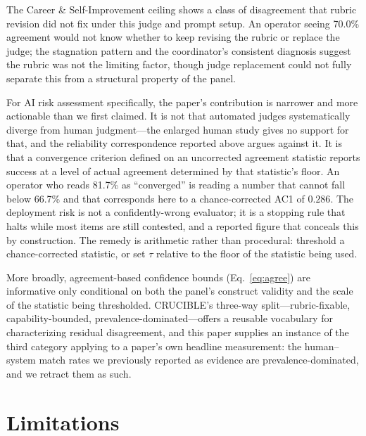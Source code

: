 \documentclass[letterpaper]{article}
\begin{document}
The Career \& Self-Improvement ceiling shows a class of disagreement that
rubric revision did not fix under this judge and prompt setup. An operator
seeing 70.0\% agreement would not know whether to keep revising the rubric or
replace the judge; the stagnation pattern and the coordinator's consistent
diagnosis suggest the rubric was not the limiting factor, though judge
replacement could not fully separate this from a structural property of the
panel.

For AI risk assessment specifically, the paper's contribution is narrower and
more actionable than we first claimed. It is not that automated judges
systematically diverge from human judgment---the enlarged human study gives no
support for that, and the reliability
correspondence reported above argues against it. It is that a convergence
criterion defined on an uncorrected agreement statistic reports success at a
level of actual agreement determined by that statistic's floor. An operator
who reads 81.7\% as ``converged'' is reading a number that cannot fall below
66.7\% and that corresponds here to a chance-corrected AC1 of $0.286$. The
deployment risk is not a confidently-wrong evaluator; it is a stopping rule
that halts while most items are still contested, and a reported figure that
conceals this by construction. The remedy is arithmetic rather than
procedural: threshold a chance-corrected statistic, or set $\tau$ relative to
the floor of the statistic being used.

More broadly, agreement-based confidence bounds (Eq.~\ref{eq:agree}) are
informative only conditional on both the panel's construct validity and the
scale of the statistic being thresholded. CRUCIBLE's three-way
split---rubric-fixable, capability-bounded, prevalence-dominated---offers a
reusable vocabulary for characterizing residual disagreement, and this paper
supplies an instance of the third category applying to a paper's own headline
measurement: the human--system match rates we previously reported as evidence
are prevalence-dominated, and we retract them as such.

\section{Limitations}
\end{document}
